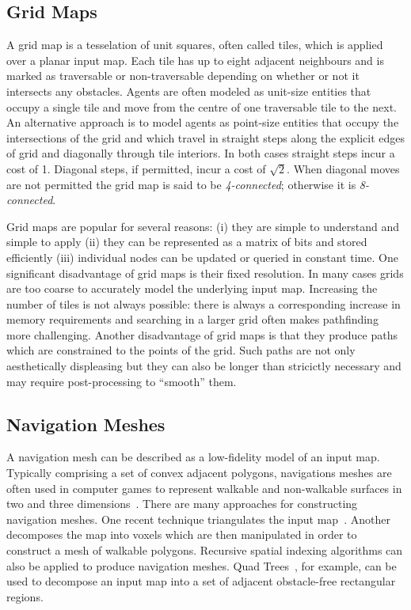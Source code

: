 \subsection{Grid Maps}
\label{cha::lit::graphs::grid}
A grid map is a tesselation of unit squares, often called tiles, which is
applied over a planar input map. Each tile has up to eight adjacent neighbours
and is marked as traversable or non-traversable depending on whether or not it
intersects any obstacles.  Agents are often modeled as unit-size entities that
occupy a single tile and move from the centre of one traversable tile to the
next.  
An alternative approach is to model agents as point-size entities that occupy 
the intersections of the grid and which travel in straight steps along the
explicit edges of grid and diagonally through tile interiors.
In both cases straight steps incur a cost of 1. Diagonal steps, if permitted, 
incur a cost of $\sqrt{2}$.  When diagonal moves are not permitted the grid map 
is said to be \emph{4-connected}; otherwise it is \emph{8-connected}.  

Grid maps are popular for several reasons: (i) they are simple to understand 
and simple to apply (ii) they can be represented as a matrix of bits and stored
efficiently (iii) individual nodes can be updated or queried in constant time.
One significant disadvantage of grid maps is their fixed resolution. In many cases 
grids are too coarse to accurately model the underlying input map. Increasing the
number of tiles is not always possible: there is always a corresponding increase in
memory requirements and searching in a larger grid often makes pathfinding more 
challenging.
Another disadvantage of grid maps is that they produce paths which are
constrained to the points of the grid. Such paths are not only aesthetically
displeasing but they can also be longer than stricictly necessary and may
require post-processing to ``smooth'' them.

\subsection{Navigation Meshes}
\label{cha::lit::graphs::nav}
A navigation mesh can be described as a low-fidelity model of an input map. 
Typically comprising a set of convex adjacent polygons, navigations meshes are
often used in computer games to represent walkable and non-walkable surfaces in
two and three dimensions~\citep{snook00,tozour02}.
There are many approaches for constructing navigation meshes.
One recent technique triangulates the input map~\citep{demyen07,kallmann10}.  
Another decomposes the map into voxels which are then manipulated in order to construct a 
mesh of walkable polygons. 
Recursive spatial indexing algorithms can also be applied to produce navigation meshes. 
Quad Trees~\citep{finkel74,samet85}, for example, can be used to decompose an input
map into a set of adjacent obstacle-free rectangular regions. 

